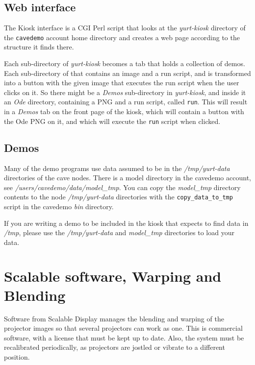 \documentclass[11pt]{article}
\newcommand{\cmd}[1]{\texttt{#1}\xspace}
\newcommand{\dir}[1]{\textit{#1}\xspace}
\begin{document}
\subsection{Web interface}

The Kiosk interface is a CGI Perl script that looks at the
\dir{yurt-kiosk} directory of the \cmd{cavedemo} account home
directory and creates a web page according to the structure it finds
there.

Each sub-directory of \dir{yurt-kiosk} becomes a tab that holds a
collection of demos.  Each sub-directory of that contains an image and
a run script, and is transformed into a button with the given image
that executes the run script when the user clicks on it.  So there
might be a \dir{Demos} sub-directory in \dir{yurt-kiosk}, and inside
it an \dir{Ode} directory, containing a PNG and a run script, called
\cmd{run}.  This will result in a \dir{Demos} tab on the front page of
the kiosk, which will contain a button with the Ode PNG on it, and
which will execute the \cmd{run} script when clicked.



\subsection{Demos}
\label{Demos}

Many of the demo programs use data assumed to be in the
\dir{/tmp/yurt-data} directories of the cave nodes.  There is a model
directory in the cavedemo account, see
\dir{/users/cavedemo/data/model\_tmp}.  You can copy the
\dir{model\_tmp} directory contents to the node \dir{/tmp/yurt-data}
directories with the \cmd{copy\_data\_to\_tmp} script in the cavedemo
\dir{bin} directory.

If you are writing a demo to be included in the kiosk that expects to
find data in \dir{/tmp}, please use the  \dir{/tmp/yurt-data} and
\dir{model\_tmp} directories to load your data.


\section{Scalable software, Warping and Blending}

Software from Scalable Display manages the blending and warping of the
projector images so that several projectors can work as one.  This is
commercial software, with a license that must be kept up to date.
Also, the system must be recalibrated periodically, as projectors are
jostled or vibrate to a different position.
\end{document}
